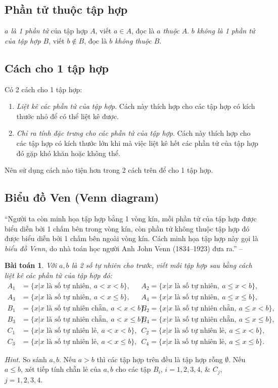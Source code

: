 \documentclass[oneside]{book}
\numberwithin{equation}{section}
\newtheorem{baitoan}{Bài toán}[section]
\begin{document}
\subsection{Phần tử thuộc tập hợp}
\textit{$a$ là 1 phần tử} của tập hợp $A$, viết $a\in A$, đọc là \textit{$a$ thuộc $A$}. \textit{$b$ không là 1 phần tử của tập hợp $B$}, viết $b\notin B$, đọc là \textit{$b$ không thuộc $B$}.

\subsection{Cách cho 1 tập hợp}
Có 2 cách cho 1 tập hợp:
\begin{enumerate}
	\item \textit{Liệt kê các phần tử của tập hợp}. Cách này thích hợp cho các tập hợp có kích thước nhỏ để có thể liệt kê được.
	\item \textit{Chỉ ra tính đặc trưng cho các phần tử của tập hợp}. Cách này thích hợp cho các tập hợp có kích thước lớn khi mà việc liệt kê hết các phần tử của tập hợp đó gặp khó khăn hoặc không thể. 
\end{enumerate}
Nên sử dụng cách nào tiện hơn trong 2 cách trên để cho 1 tập hợp.

\subsection{Biểu đồ Ven (Venn diagram)}
``Người ta còn minh họa tập hợp bằng 1 vòng kín, mỗi phần tử của tập hợp được biểu diễn bởi 1 chấm bên trong vòng kín, còn phần tử không thuộc tập hợp đó được biểu diễn bởi 1 chấm bên ngoài vòng kín. Cách minh họa tập hợp này gọi là \textit{biểu đồ Venn}, do nhà toán học người Anh John Venn (1834--1923) đưa ra.'' -- \cite[p. 8]{Thai_Anh_Dat_Ha_Loan_Nam_Quang_Toan_6_tap_1}

\begin{baitoan}
	Với $a,b$ là 2 số tự nhiên cho trước, viết mỗi tập hợp sau bằng cách liệt kê các phần tử của tập hợp đó:
	\begin{align*}
		A_1 &= \{x|x\mbox{ là số tự nhiên},\ a < x < b\},\ &&A_2 = \{x|x\mbox{ là số tự nhiên},\ a\le x < b\},\\
		A_3 &= \{x|x\mbox{ là số tự nhiên},\ a < x\le b\},\ &&A_4 = \{x|x\mbox{ là số tự nhiên},\ a\le x\le b\},\\
		B_1 &= \{x|x\mbox{ là số tự nhiên chẵn},\ a < x < b\},\ &&B_2 = \{x|x\mbox{ là số tự nhiên chẵn},\ a\le x < b\},\\
		B_3 &= \{x|x\mbox{ là số tự nhiên chẵn},\ a < x\le b\},\ &&B_4 = \{x|x\mbox{ là số tự nhiên chẵn},\ a\le x\le b\},\\
		C_1 &= \{x|x\mbox{ là số tự nhiên lẻ},\ a < x < b\},\ &&C_2 = \{x|x\mbox{ là số tự nhiên lẻ},\ a\le x < b\},\\ C_3 &= \{x|x\mbox{ là số tự nhiên lẻ},\ a < x\le b\},\ &&C_4 = \{x|x\mbox{ là số tự nhiên lẻ},\ a\le x\le b\}.
	\end{align*}
\end{baitoan}
\textit{Hint.} So sánh $a,b$. Nếu $a > b$ thì các tập hợp trên đều là tập hợp rỗng $\emptyset$. Nếu $a\le b$, xét tiếp tính chẵn lẻ của $a,b$ cho các tập $B_i$, $i = 1,2,3,4$, \& $C_j$, $j = 1,2,3,4$.
\end{document}
